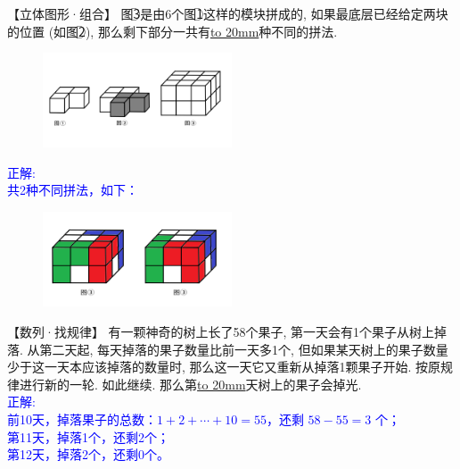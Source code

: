 \item {
    【立体图形·组合】
    图\textcircled{3}是由6个图\textcircled{1}这样的模块拼成的, 如果最底层已经给定两块的位置 (如图\textcircled{2}), 那么剩下部分一共有\underline{\hbox to 20mm{}}种不同的拼法.
    \begin{figure}[H] 
        \centering
        \includegraphics[width=0.5\textwidth]{./pics/Chapter_4/2016_2.png}
    \end{figure}
    \ifshowSolution 
        \fangsong{}\textcolor{blue}{
            正解: \\
            共2种不同拼法，如下：\\
            \begin{figure}[H] 
                \centering
                \includegraphics[width=0.5\textwidth]{./pics/Chapter_4/seikai_2016_2.png}
            \end{figure}
        }
    \else
        \vspace{1cm}
    \fi
}

\item {
    【数列·找规律】
    有一颗神奇的树上长了58个果子, 第一天会有1个果子从树上掉落. 从第二天起, 每天掉落的果子数量比前一天多1个, 但如果某天树上的果子数量少于这一天本应该掉落的数量时, 那么这一天它又重新从掉落1颗果子开始. 按原规律进行新的一轮. 如此继续. 那么第\underline{\hbox to 20mm{}}天树上的果子会掉光.
    \ifshowSolution 
        \fangsong{}\textcolor{blue}{
            \\正解: \\
            前10天，掉落果子的总数：$1+2+\cdots +10 = 55$，还剩 $58-55=3$ 个；\\
            第11天，掉落1个，还剩2个；\\
            第12天，掉落2个，还剩0个。
        }
    \else
        \vspace{1cm}
    \fi
}



